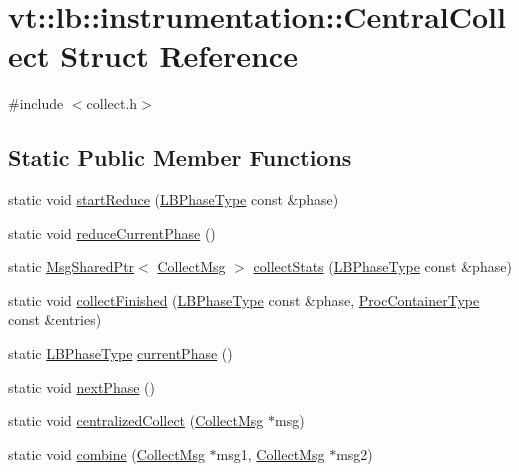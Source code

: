\hypertarget{structvt_1_1lb_1_1instrumentation_1_1_central_collect}{}\section{vt\+:\+:lb\+:\+:instrumentation\+:\+:Central\+Collect Struct Reference}
\label{structvt_1_1lb_1_1instrumentation_1_1_central_collect}


{\ttfamily \#include $<$collect.\+h$>$}

\subsection*{Static Public Member Functions}
\begin{DoxyCompactItemize}
\item 
static void \hyperlink{structvt_1_1lb_1_1instrumentation_1_1_central_collect_a1b5d16c13976ea4c6db0275ef3ff35d8}{start\+Reduce} (\hyperlink{namespacevt_a5505d0bab25ce2ff566a8e015871b379}{L\+B\+Phase\+Type} const \&phase)
\item 
static void \hyperlink{structvt_1_1lb_1_1instrumentation_1_1_central_collect_adc3e069b48fdd2031d23cbfa66885537}{reduce\+Current\+Phase} ()
\item 
static \hyperlink{namespacevt_ab2b3d506ec8e8d1540aede826d84a239}{Msg\+Shared\+Ptr}$<$ \hyperlink{structvt_1_1lb_1_1instrumentation_1_1_collect_msg}{Collect\+Msg} $>$ \hyperlink{structvt_1_1lb_1_1instrumentation_1_1_central_collect_a7161d3f662ad33336ff3dfacfb141e45}{collect\+Stats} (\hyperlink{namespacevt_a5505d0bab25ce2ff566a8e015871b379}{L\+B\+Phase\+Type} const \&phase)
\item 
static void \hyperlink{structvt_1_1lb_1_1instrumentation_1_1_central_collect_a3b41c4af5113e069d87d5d10e3c7ae59}{collect\+Finished} (\hyperlink{namespacevt_a5505d0bab25ce2ff566a8e015871b379}{L\+B\+Phase\+Type} const \&phase, \hyperlink{namespacevt_1_1lb_af7c6ee21a7b3966b7ab64c5b626d30f8}{Proc\+Container\+Type} const \&entries)
\item 
static \hyperlink{namespacevt_a5505d0bab25ce2ff566a8e015871b379}{L\+B\+Phase\+Type} \hyperlink{structvt_1_1lb_1_1instrumentation_1_1_central_collect_ae9561fb73a1aa198c1b69941870b8a6a}{current\+Phase} ()
\item 
static void \hyperlink{structvt_1_1lb_1_1instrumentation_1_1_central_collect_aa0cc1c988760bbb5d6f1fd008e827777}{next\+Phase} ()
\item 
static void \hyperlink{structvt_1_1lb_1_1instrumentation_1_1_central_collect_a08855053af75446a7bc080592126bb1a}{centralized\+Collect} (\hyperlink{structvt_1_1lb_1_1instrumentation_1_1_collect_msg}{Collect\+Msg} $\ast$msg)
\item 
static void \hyperlink{structvt_1_1lb_1_1instrumentation_1_1_central_collect_a38b6e55982754362cbea1921e044038c}{combine} (\hyperlink{structvt_1_1lb_1_1instrumentation_1_1_collect_msg}{Collect\+Msg} $\ast$msg1, \hyperlink{structvt_1_1lb_1_1instrumentation_1_1_collect_msg}{Collect\+Msg} $\ast$msg2)
\end{DoxyCompactItemize}



